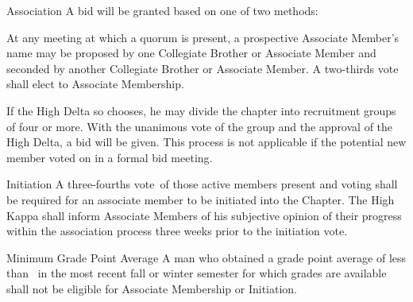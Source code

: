 \documentclass{article}
\begin{document}
\begin{subsubsectionList}
  \item {\titleStyle Association\titleSuffix}
  A bid will be granted based on one of two methods:

  \begin{orderedList}
    \item At any meeting at which a quorum is present, a prospective Associate
    Member’s name may be proposed by one Collegiate Brother or Associate Member
    and seconded by another Collegiate Brother or Associate Member. A two-thirds
    vote shall elect to Associate Membership.

    \item If the High Delta so chooses, he may divide the chapter into
    recruitment groups of four or more. With the unanimous vote of the group and
    the approval of the High Delta, a bid will be given. This process is not
    applicable if the potential new member voted on in a formal bid meeting.
  \end{orderedList}

  \item {\titleStyle Initiation\titleSuffix}
  \newcommand*\voteForInitiation{three-fourths vote}
  A \voteForInitiation\ of those active members present and voting shall be
  required for an associate member to be initiated into the Chapter. The High
  Kappa shall inform Associate Members of his subjective opinion of their
  progress within the association process three weeks prior to the initiation
  vote.

  \item {\titleStyle Minimum Grade Point Average\titleSuffix}
  A man who obtained a grade point average  of less
  than \minimumGradePointAverage\ in the most recent fall or winter semester for
  which grades are available shall not be eligible for Associate Membership or
  Initiation.


\end{subsubsectionList}
\end{document}
